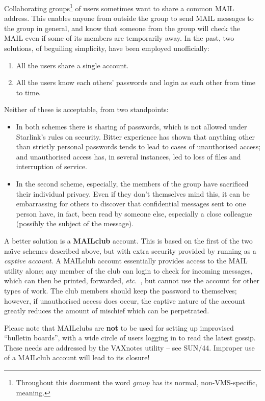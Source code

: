 Collaborating groups\footnote{Throughout this
document the word
{\it group} has its normal, non-VMS-specific, meaning.}
of users sometimes want to share a common
MAIL address.  This enables anyone from outside the group
to send MAIL messages to the group in general,
and know that someone from the group will check the MAIL even
if some of its members are temporarily away.  In the past, two
solutions, of beguiling simplicity, have been employed unofficially:
\begin{enumerate}
\item All the users share a single account.
\item All the users know each others' passwords and login
as each other from time to time.
\end{enumerate}
Neither of these is acceptable, from two standpoints:
\begin{itemize}
\item In both schemes there is sharing of passwords, which is
not allowed under Starlink's rules on security.  Bitter
experience has shown that anything other than strictly personal
passwords tends to lead to cases of unauthorised access; and
unauthorised access has, in several instances, led to loss of
files and interruption of service.
\item In the second scheme, especially, the members of the group
have sacrificed their individual privacy.  Even if they don't
themselves mind this, it can
be embarrassing for others to discover that confidential messages
sent to one person have, in fact, been read by someone else,
especially a close colleague (possibly the subject of the
message).
\end{itemize}

A better solution is a {\bf MAILclub} account.  This is based on
the first of the two
na\"{\i}ve schemes described above, but with extra security
provided by running as a {\it captive account}.  A MAILclub account
essentially provides access to the MAIL utility alone;  any member
of the club can login to check for incoming messages, which can then
be printed, forwarded, {\it etc.\ }, but cannot use the account for
other types of work.  The club members should keep the password
to themselves;  however, if unauthorised access does occur, the
captive nature of the account greatly reduces the amount of mischief which
can be perpetrated.

Please note that MAILclubs are {\bf not} to be used for setting up
improvised ``bulletin boards'', with a wide circle of users logging
in to read the latest gossip.  These needs are addressed by the
VAXnotes utility -- see SUN/44.  Improper use of a
MAILclub account will lead to its closure!

